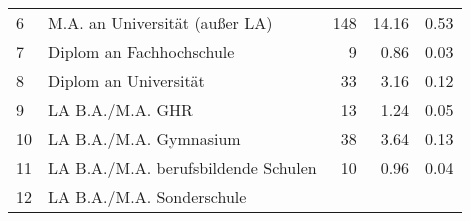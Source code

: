 \begin{longtable}{lXrrr}
     6 &
     \multicolumn{1}{X}{ M.A. an Universität (außer LA)   } &


       \num{148} &
       \num[round-mode=places,round-precision=2]{14.16} &
         \num[round-mode=places,round-precision=2]{0.53} \\

     7 &
     \multicolumn{1}{X}{ Diplom an Fachhochschule   } &


       \num{9} &
       \num[round-mode=places,round-precision=2]{0.86} &
         \num[round-mode=places,round-precision=2]{0.03} \\

     8 &
     \multicolumn{1}{X}{ Diplom an Universität   } &


       \num{33} &
       \num[round-mode=places,round-precision=2]{3.16} &
         \num[round-mode=places,round-precision=2]{0.12} \\

     9 &
     \multicolumn{1}{X}{ LA B.A./M.A. GHR   } &


       \num{13} &
       \num[round-mode=places,round-precision=2]{1.24} &
         \num[round-mode=places,round-precision=2]{0.05} \\

     10 &
     \multicolumn{1}{X}{ LA B.A./M.A. Gymnasium   } &


       \num{38} &
       \num[round-mode=places,round-precision=2]{3.64} &
         \num[round-mode=places,round-precision=2]{0.13} \\

     11 &
     \multicolumn{1}{X}{ LA B.A./M.A. berufsbildende Schulen   } &


       \num{10} &
       \num[round-mode=places,round-precision=2]{0.96} &
         \num[round-mode=places,round-precision=2]{0.04} \\

     12 &
     \multicolumn{1}{X}{ LA B.A./M.A. Sonderschule   } &



\end{longtable}
